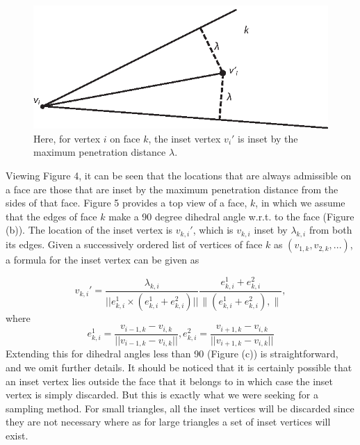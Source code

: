\documentclass[9pt,twocolumn]{article}
\begin{document}
\begin{figure}[t]
\centering
\includegraphics[scale = .84]{Figure_4a.eps}
\caption{Here, for vertex $i$ on face $k$, the inset vertex $v_i'$ is inset by the maximum penetration distance $\lambda$.}
\label{PenetrationDist2}
\end{figure}

Viewing Figure 4, it can be seen that the locations that are always admissible on a face are those that are inset by the maximum penetration distance from the sides of that face. Figure 5 provides a top view of a face, $k$, in which we assume that the edges of face $k$ make a 90 degree dihedral angle w.r.t. to the face (Figure (b)). The location of the inset vertex is $v_{k,i}'$, which is $v_{k,i}$ inset by $\lambda_{k,i}$ from both its edges. Given a successively ordered list of vertices of face $k$ as $(v_{1,k}, v_{2,k}, ...)$, a formula for the inset vertex can be given as

\begin{equation}
v_{k,i}' = \frac{\lambda_{k,i}}{|| e_{k,i}^1 \times (e_{k,i}^1 + e_{k,i}^2)||}\frac{e_{k,i}^1 + e_{k,i}^2}{\|(e_{k,i}^1 + e_{k,i}^2),\|},
\end{equation}
where
\begin{equation*}
 e_{k,i}^1 = \frac{v_{i-1,k} - v_{i,k}}{||v_{i-1,k} - v_{i,k}||}, e_{k,i}^2 = \frac{v_{i+1,k} - v_{i,k}}{||v_{i+1,k} - v_{i,k}||}
\end{equation*}
Extending this for dihedral angles less than 90 (Figure (c)) is straightforward, and we omit further details. It should be noticed that it is certainly possible that an inset vertex lies outside the face that it belongs to in which case the inset vertex is simply discarded. But this is exactly what we were seeking for a sampling method. For small triangles, all the inset vertices will be discarded since they are not necessary where as for large triangles a set of inset vertices will exist. \newline
\end{document}
